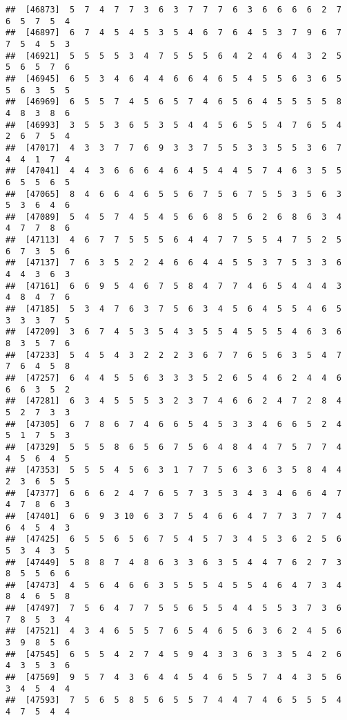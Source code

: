 \documentclass[
]{book}
\begin{document}
\begin{verbatim}
##  [46873]  5  7  4  7  7  3  6  3  7  7  7  6  3  6  6  6  6  2  7  6  5  7  5  4
##  [46897]  6  7  4  5  4  5  3  5  4  6  7  6  4  5  3  7  9  6  7  7  5  4  5  3
##  [46921]  5  5  5  5  3  4  7  5  5  5  6  4  2  4  6  4  3  2  5  5  6  5  7  6
##  [46945]  6  5  3  4  6  4  4  6  6  4  6  5  4  5  5  6  3  6  5  5  6  3  5  5
##  [46969]  6  5  5  7  4  5  6  5  7  4  6  5  6  4  5  5  5  5  8  4  8  3  8  6
##  [46993]  3  5  5  3  6  5  3  5  4  4  5  6  5  5  4  7  6  5  4  2  6  7  5  4
##  [47017]  4  3  3  7  7  6  9  3  3  7  5  5  3  3  5  5  3  6  7  4  4  1  7  4
##  [47041]  4  4  3  6  6  6  4  6  4  5  4  4  5  7  4  6  3  5  5  6  5  5  6  5
##  [47065]  8  4  6  6  4  6  5  5  6  7  5  6  7  5  5  3  5  6  3  5  3  6  4  6
##  [47089]  5  4  5  7  4  5  4  5  6  6  8  5  6  2  6  8  6  3  4  4  7  7  8  6
##  [47113]  4  6  7  7  5  5  5  6  4  4  7  7  5  5  4  7  5  2  5  6  7  3  5  6
##  [47137]  7  6  3  5  2  2  4  6  6  4  4  5  5  3  7  5  3  3  6  4  4  3  6  3
##  [47161]  6  6  9  5  4  6  7  5  8  4  7  7  4  6  5  4  4  4  3  4  8  4  7  6
##  [47185]  5  3  4  7  6  3  7  5  6  3  4  5  6  4  5  5  4  6  5  3  3  3  7  5
##  [47209]  3  6  7  4  5  3  5  4  3  5  5  4  5  5  5  4  6  3  6  8  3  5  7  6
##  [47233]  5  4  5  4  3  2  2  2  3  6  7  7  6  5  6  3  5  4  7  7  6  4  5  8
##  [47257]  6  4  4  5  5  6  3  3  3  5  2  6  5  4  6  2  4  4  6  6  6  3  5  2
##  [47281]  6  3  4  5  5  5  3  2  3  7  4  6  6  2  4  7  2  8  4  5  2  7  3  3
##  [47305]  6  7  8  6  7  4  6  6  5  4  5  3  3  4  6  6  5  2  4  5  1  7  5  3
##  [47329]  5  5  5  8  6  5  6  7  5  6  4  8  4  4  7  5  7  7  4  4  5  6  4  5
##  [47353]  5  5  5  4  5  6  3  1  7  7  5  6  3  6  3  5  8  4  4  2  3  6  5  5
##  [47377]  6  6  6  2  4  7  6  5  7  3  5  3  4  3  4  6  6  4  7  4  7  8  6  3
##  [47401]  6  6  9  3 10  6  3  7  5  4  6  6  4  7  7  3  7  7  4  6  4  5  4  3
##  [47425]  6  5  5  6  5  6  7  5  4  5  7  3  4  5  3  6  2  5  6  5  3  4  3  5
##  [47449]  5  8  8  7  4  8  6  3  3  6  3  5  4  4  7  6  2  7  3  8  5  5  6  6
##  [47473]  4  5  6  4  6  6  3  5  5  5  4  5  5  4  6  4  7  3  4  8  4  6  5  8
##  [47497]  7  5  6  4  7  7  5  5  6  5  5  4  4  5  5  3  7  3  6  7  8  5  3  4
##  [47521]  4  3  4  6  5  5  7  6  5  4  6  5  6  3  6  2  4  5  6  3  9  8  5  6
##  [47545]  6  5  5  4  2  7  4  5  9  4  3  3  6  3  3  5  4  2  6  4  3  5  3  6
##  [47569]  9  5  7  4  3  6  4  4  5  4  6  5  5  7  4  4  3  5  6  3  4  5  4  4
##  [47593]  7  5  6  5  8  5  6  5  5  7  4  4  7  4  6  5  5  5  4  4  7  5  4  4

\end{verbatim}
\end{document}
